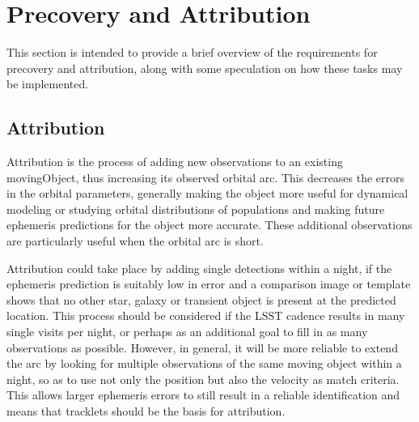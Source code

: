 \section{Precovery and Attribution}
\label{precoveryattribution}

This section is intended to provide a brief overview of the requirements for precovery and attribution, along with some speculation on how these tasks may be implemented. 

\subsection{Attribution}

Attribution is the process of adding new observations to an existing movingObject, thus increasing its observed orbital arc. This decreases the errors in the orbital parameters, generally making the object more useful for dynamical modeling or studying orbital distributions of populations and making future ephemeris predictions for the object more accurate. These additional observations are particularly useful when the orbital arc is short. 

Attribution could take place by adding single detections within a night, if the ephemeris prediction is suitably low in error and a comparison image or template shows that no other star, galaxy or transient object is present at the predicted location. This process should be considered if the LSST cadence results in many single visits per night, or perhaps as an additional goal to fill in as many observations as possible. However, in general, it will be more reliable to extend the arc by looking for multiple observations of the same moving object within a night, so as to use not only the position but also the velocity as match criteria. This allows larger ephemeris errors to still result in a reliable identification and means that tracklets should be the basis for attribution. 

